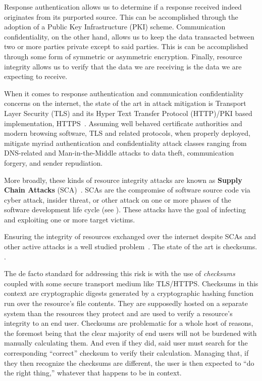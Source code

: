 Response authentication allows us to determine if a response received indeed
originates from its purported source. This can be accomplished through the
adoption of a Public Key Infrastructure (PKI) scheme. Communication
confidentiality, on the other hand, allows us to keep the data transacted
between two or more parties private except to said parties. This is can be
accomplished through some form of symmetric or asymmetric encryption. Finally,
resource integrity allows us to verify that the data we are receiving is the
data we are expecting to receive.


When it comes to response authentication and communication confidentiality
concerns on the internet, the state of the art in attack mitigation is Transport
Layer Security (TLS) and its Hyper Text Transfer Protocol (HTTP)/PKI based
implementation, HTTPS~\cite{TLS1.2, TLS1, TLS0, HTTPS}. Assuming well behaved
certificate authorities and modern browsing software, TLS and related protocols,
when properly deployed, mitigate myriad authentication and confidentiality
attack classes ranging from DNS-related and Man-in-the-Middle attacks to data
theft, communication forgery, and sender repudiation.

More broadly, these kinds of resource integrity attacks are known as
\textbf{Supply Chain Attacks} (SCA)~\cite{SCA}. SCAs are the compromise of
software source code via cyber attack, insider threat, or other attack on one or
more phases of the software development life cycle (see ). These
attacks have the goal of infecting and exploiting one or more target victims.

Ensuring the integrity of resources exchanged over the internet despite SCAs and
other active attacks is a well studied problem~\cite{MD5Header, HTTP1.1, HTTPS,
SRI, LF, OpenPGP1, DNSSEC}. The state of the art is checksums. .


The de facto standard for addressing this risk is with the use of
\textit{checksums} coupled with some secure transport medium like TLS/HTTPS.
Checksums in this context are cryptographic digests generated by a cryptographic
hashing function run over the resource's file contents. They are supposedly
hosted on a separate system than the resources they protect and are used to
verify a resource’s integrity to an end user. Checksums are problematic for a
whole host of reasons, the foremost being that the clear majority of end users
will not be burdened with manually calculating them. And even if they did, said
user must search for the corresponding ``correct'' checksum to verify their
calculation. Managing that, if they then recognize the checksums are different,
the user is then expected to ``do the right thing,'' whatever that happens to be
in context.

